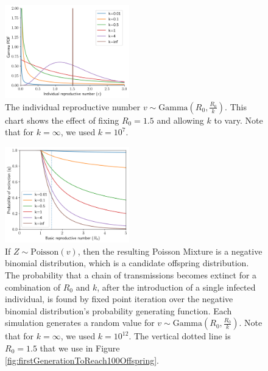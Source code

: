 \documentclass{article}
\begin{document}
\begin{figure}[]
	\begin{mdframed}[backgroundcolor=grey250,rightline=false,leftline=false,topline=false]
    \includegraphics[width=0.48\textwidth, center]{2a_gamma.png}
    \caption{The individual reproductive number $ v \sim \text{Gamma}(R_0, \frac{R_0}{k}) $. This chart shows the effect of fixing $ R_0=1.5 $ and allowing $ k $ to vary. Note that for $ k = \infty $, we used $ k=10^7 $.}
    \label{fig:gamma(R0,R0/k)}
	\end{mdframed}
\end{figure}

\begin{figure}[]
	\begin{mdframed}[backgroundcolor=grey250,rightline=false,leftline=false,topline=false]
    \includegraphics[width=0.48\textwidth, center]{2b_probabilityOfExtinction.png}
    \caption{If $ Z \sim \text{Poisson}(v) $, then the resulting Poisson Mixture is a negative binomial distribution, which is a candidate offspring distribution. The probability that a chain of transmissions becomes extinct for a combination of $R_0$ and $ k $, after the introduction of a single infected individual, is found by fixed point iteration over the negative binomial distribution's probability generating function. Each simulation generates a random value for $ v \sim \text{Gamma}(R_0, \frac{R_0}{k})$. Note that for $ k = \infty $, we used $ k=10^{12} $. The vertical dotted line is $ R_0=1.5$ that we use in Figure \ref{fig:firstGenerationToReach100Offspring}.}
    \label{fig:probabilityOfExtinction}
	\end{mdframed}
\end{figure}
\end{document}
